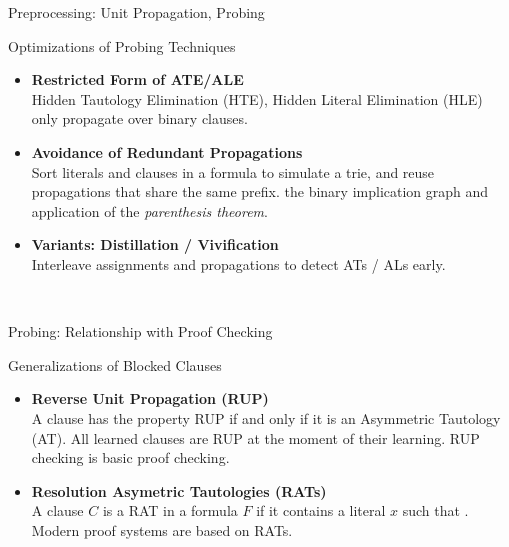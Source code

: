 \documentclass[t]{sdqbeamer}
\begin{document}
\begin{frame}{Preprocessing: Unit Propagation, Probing}
\begin{block}{Optimizations of Probing Techniques}~\\
\begin{itemize}\setlength{\itemsep}{1em}
    \item \textbf{Restricted Form of ATE/ALE}\\[1pt]
    Hidden Tautology Elimination (HTE), Hidden Literal Elimination (HLE) only propagate over binary clauses.
    \item \textbf{Avoidance of Redundant Propagations}\\[1pt]
    Sort literals and clauses in a formula to simulate a trie, and reuse propagations that share the same prefix.
    the binary implication graph and application of the \emph{parenthesis theorem}.
    \item \textbf{Variants: Distillation / Vivification}\\[1pt]
    Interleave assignments and propagations to detect ATs / ALs early.
\end{itemize}~\\
\end{block}
\end{frame}


\begin{frame}{Probing: Relationship with Proof Checking}
\begin{block}{Generalizations of Blocked Clauses}~\\
\begin{itemize}\setlength{\itemsep}{1em}
    \item \textbf{Reverse Unit Propagation (RUP)}\\[1pt]
    A clause has the property RUP if and only if it is an Asymmetric Tautology (AT).
    All learned clauses are RUP at the moment of their learning.
    RUP checking is basic proof checking.
    \item \textbf{Resolution Asymetric Tautologies (RATs)}\\[1pt]
    A clause $C$ is a RAT in a formula $F$ if it contains a literal $x$ such that .
    Modern proof systems are based on RATs.
\end{itemize}
~\\
\end{block}
\end{frame}
\end{document}
